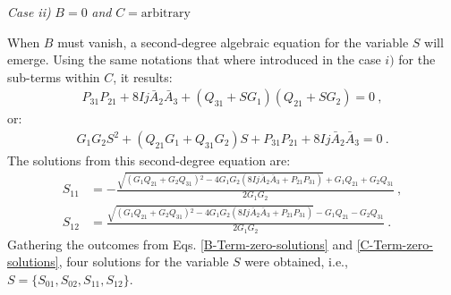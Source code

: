 \textit{Case ii)} $B=0$ \textit{and} $C=\text{arbitrary}$

When $B$ must vanish, a second-degree algebraic equation for the variable $S$ will emerge. Using the same notations that where introduced in the case $i)$ for the sub-terms within $C$, it results:
\begin{align}
    P_{31}P_{21}+8Ij\bar{A}_2\bar{A}_3+\left(Q_{31}+SG_1\right)\left(Q_{21}+SG_2\right)=0\ , \nonumber
\end{align}
or:
\begin{align}
    G_1G_2S^2+\left(Q_{21}G_1+Q_{31}G_2\right)S+P_{31}P_{21}+8Ij\bar{A}_2\bar{A}_3=0\ .
    \label{S-parameter-equations-set2}
\end{align}
The solutions from this second-degree equation are:
\begin{align}
    S_{11}&=-\frac{\sqrt{\left(G_1 Q_{21}+G_2 Q_{31}\right){}^2-4 G_1 G_2 \left(8 I j \bar{A}_2 \bar{A}_3+P_{21} P_{31}\right)}+G_1 Q_{21}+G_2 Q_{31}}{2 G_1 G_2}\ ,\nonumber\\
    S_{12}&=\frac{\sqrt{\left(G_1 Q_{21}+G_2 Q_{31}\right){}^2-4 G_1 G_2 \left(8 I j \bar{A}_2 \bar{A}_3+P_{21} P_{31}\right)}-G_1 Q_{21}-G_2 Q_{31}}{2 G_1 G_2}\ .
    \label{B-Term-zero-solutions}
\end{align}
Gathering the outcomes from Eqs. \ref{B-Term-zero-solutions} and \ref{C-Term-zero-solutions}, four solutions for the variable $S$ were obtained, i.e., $S=\{S_{01},S_{02},S_{11},S_{12}\}$.

